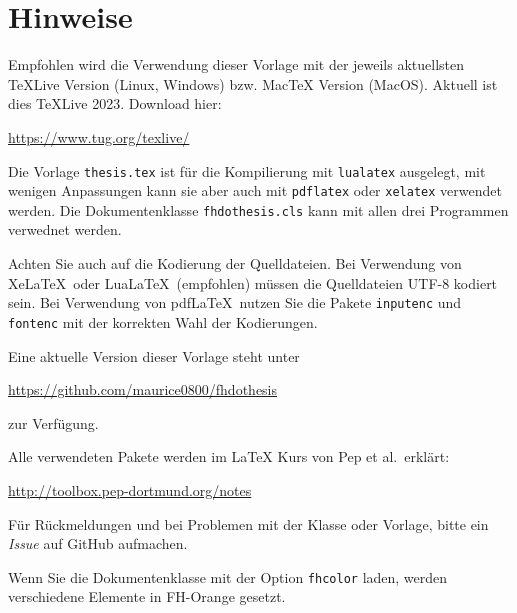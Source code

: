 \thispagestyle{empty}
\setcounter{page}{2}
\section*{Hinweise}
Empfohlen wird die Verwendung dieser Vorlage mit der jeweils aktuellsten TeXLive Version (Linux, Windows) bzw. MacTeX Version (MacOS).
Aktuell ist dies TeXLive 2023. Download hier:
\begin{center}
  \ttfamily\url{https://www.tug.org/texlive/}
\end{center}

Die Vorlage \texttt{thesis.tex} ist für die Kompilierung mit \texttt{lualatex} ausgelegt, mit wenigen Anpassungen kann sie aber auch mit \texttt{pdflatex} oder \texttt{xelatex} verwendet werden.
Die Dokumentenklasse \texttt{fhdothesis.cls} kann mit allen drei Programmen verwednet werden.

Achten Sie auch auf die Kodierung der Quelldateien.
Bei Verwendung von Xe\LaTeX\ oder Lua\LaTeX\ (empfohlen) müssen die
Quelldateien UTF-8 kodiert sein.
Bei Verwendung von pdf\LaTeX\ nutzen Sie die Pakete \texttt{inputenc} und \texttt{fontenc} mit der korrekten Wahl der Kodierungen.

Eine aktuelle Version dieser Vorlage steht unter 
\begin{center}
\ttfamily\url{https://github.com/maurice0800/fhdothesis}
\end{center}
zur Verfügung.

Alle verwendeten Pakete werden im \LaTeX{} Kurs von Pep et al.\ erklärt:
\begin{center}
  \ttfamily\url{http://toolbox.pep-dortmund.org/notes}
\end{center}

Für Rückmeldungen und bei Problemen mit der Klasse oder Vorlage, bitte ein \emph{Issue} auf GitHub aufmachen.

Wenn Sie die Dokumentenklasse mit der Option \texttt{fhcolor} laden, werden verschiedene Elemente in FH-Orange gesetzt.
